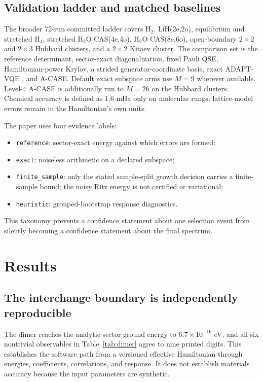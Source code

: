 \documentclass[aps,pra,reprint,superscriptaddress,nofootinbib,floatfix]{revtex4-2}
\begin{document}
\subsection{Validation ladder and matched baselines}
\label{sec:ladder}

The broader 72-run committed ladder covers H$_2$, LiH(2e,2o), equilibrium and
stretched H$_4$, stretched H$_2$O CAS(4e,4o), H$_2$O CAS(8e,6o), open-boundary
$2\times2$ and $2\times3$ Hubbard clusters, and a $2\times2$ Kitaev cluster.
The comparison set is the reference determinant, sector-exact diagonalization,
fixed Pauli QSE, Hamiltonian-power Krylov, a strided generator-coordinate
basis, exact ADAPT-VQE \cite{grimsley2019adapt}, and A-CASE.  Default exact
subspace arms use
$M=9$ wherever available.  Level-4 A-CASE is additionally run to $M=26$ on
the Hubbard clusters.  Chemical accuracy is defined as $1.6$ mHa only on
molecular rungs; lattice-model errors remain in the Hamiltonian's own units.

The paper uses four evidence labels:
\begin{itemize}
 \item \texttt{reference}: sector-exact energy against which errors are formed;
 \item \texttt{exact}: noiseless arithmetic on a declared subspace;
 \item \texttt{finite\_sample}: only the stated sample-split growth decision
 carries a finite-sample bound; the noisy Ritz energy is not certified or
 variational;
 \item \texttt{heuristic}: grouped-bootstrap response diagnostics.
\end{itemize}
This taxonomy prevents a confidence statement about one selection event from
silently becoming a confidence statement about the final spectrum.

\section{Results}
\label{sec:results}

\subsection{The interchange boundary is independently reproducible}
\label{sec:results-boundary}

The dimer reaches the analytic sector ground energy to
$6.7\times10^{-16}$ eV, and all six nontrivial observables in
Table~\ref{tab:dimer} agree to nine printed digits.  This establishes the
software path from a versioned effective Hamiltonian through energies,
coefficients, correlations, and response.  It does not establish materials
accuracy because the input parameters are synthetic.
\end{document}
